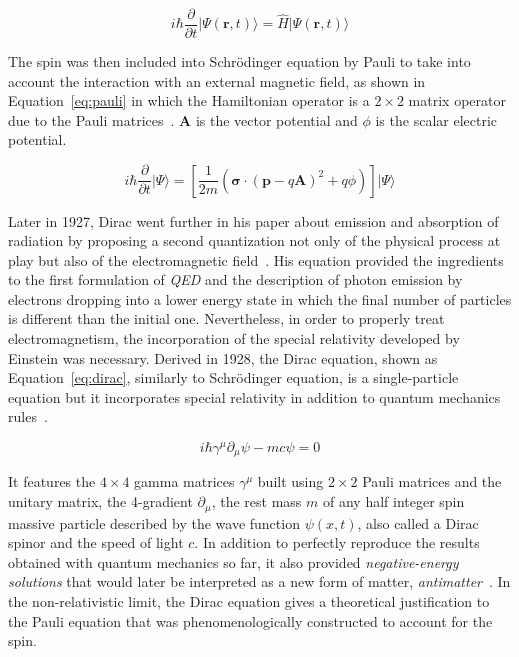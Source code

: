 	\begin{equation}
		\label{eq:schrodinger}
		i\hbar \frac{\partial}{\partial t} \vert \Psi(\mathbf{r},t)\rangle  = \hat{H} \vert \Psi(\mathbf{r},t)\rangle
	\end{equation}
	
	The spin was then included into Schrödinger equation by Pauli to take into account the interaction with an external magnetic field, as shown in Equation~\ref{eq:pauli} in which the Hamiltonian operator is a $2 \times 2$ matrix operator due to the Pauli matrices~\cite{PAULI1927}. $\mathbf{A}$ is the vector potential and $\phi$ is the scalar electric potential.
	
	\begin{equation}
		\label{eq:pauli}
		i\hbar \frac{\partial}{\partial t} \vert\Psi\rangle  =  \left[\frac{1}{2m}(\mathbf{\sigma}\cdot(\mathbf{p}-q\mathbf{A})^2+q\phi)\right]\vert\Psi\rangle
	\end{equation}
	
	Later in 1927, Dirac went further in his paper about emission and absorption of radiation by proposing a second quantization not only of the physical process at play but also of the electromagnetic field~\cite{DIRAC1927}. His equation provided the ingredients to the first formulation of \textit{\acf{QED}} and the description of photon emission by electrons dropping into a lower energy state in which the final number of particles is different than the initial one. Nevertheless, in order to properly treat electromagnetism, the incorporation of the special relativity developed by Einstein was necessary. Derived in 1928, the Dirac equation, shown as Equation~\ref{eq:dirac}, similarly to Schrödinger equation, is a single-particle equation but it incorporates special relativity in addition to quantum mechanics rules~\cite{DIRAC1928}.
	
	\begin{equation}
		\label{eq:dirac}
		i\hbar \gamma^\mu\partial_\mu\psi - mc\psi = 0
	\end{equation}
	
	It features the $4 \times 4$ gamma matrices $\gamma^\mu$ built using $2 \times 2$ Pauli matrices and the unitary matrix, the 4-gradient $\partial_\mu$, the rest mass $m$ of any half integer spin massive particle described by the wave function $\psi(x,t)$, also called a Dirac spinor and the speed of light $c$. In addition to perfectly reproduce the results obtained with quantum mechanics so far, it also provided \textit{negative-energy solutions} that would later be interpreted as a new form of matter, \textit{antimatter}~\cite{OPPENHEIMER1930I,DIRAC1931}. In the non-relativistic limit, the Dirac equation gives a theoretical justification to the Pauli equation that was phenomenologically constructed to account for the spin.
	
